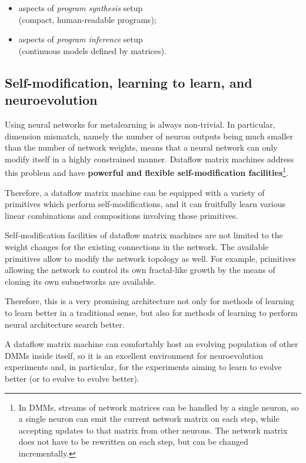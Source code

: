 \documentclass{article}
\begin{document}
  \begin{itemize}
      \item aspects of {\em program synthesis} setup\\ (compact, human-readable programs);
      \item aspects of {\em program inference} setup\\ (continuous models defined by matrices).
  \end{itemize}

\subsection{Self-modification, learning to learn, and neuroevolution} Using neural networks for metalearning
is always non-trivial. In particular, dimension mismatch, namely the number of neuron outputs 
being much smaller than the number of network weights,
means that a neural network
can only modify itself in a highly constrained manner. Dataflow matrix machines address
this problem and have {\bf powerful and flexible self-modification facilities}\footnote{In DMMs, streams of network matrices
can be handled by a single neuron, so a single neuron can emit the current network matrix on each step, while
accepting updates to that matrix from other neurons. The network matrix does not have to be rewritten on each step,
but can be changed incrementally.}.

Therefore, a dataflow matrix machine can be equipped with a variety of primitives
which perform self-modifications, and it can fruitfully learn various linear combinations and
compositions involving those primitives.

Self-modification facilities of dataflow matrix machines are not limited to the weight
changes for the existing connections in the network. The available primitives allow to
modify the network topology as well. For example, primitives allowing the network
to control its own fractal-like growth by the means of cloning its own subnetworks
are available.

Therefore, this is a very promising architecture not only for methods of learning to learn
better in a traditional sense, but also for methods of learning to perform
neural architecture search better. 

A dataflow matrix machine can comfortably host
an evolving population of other DMMs inside itself, so it is
an excellent environment for neuroevolution experiments and, in particular,
for the experiments aiming to learn to evolve better (or to evolve to evolve better).
\end{document}
